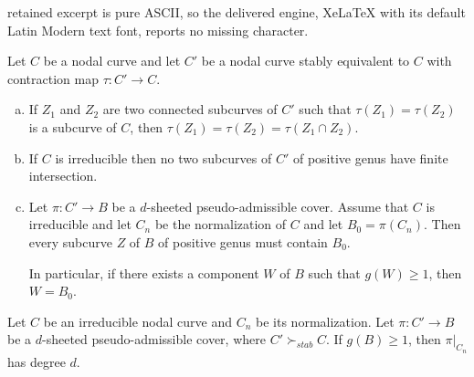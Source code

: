 \documentclass[10pt,a4paper]{amsart}
\newcommand{\steq}{\succ_{stab}}
\begin{document}
retained excerpt is pure ASCII, so the delivered engine, XeLaTeX with its default Latin Modern text font, reports no missing character.
\begin{lemma}\label{lem:3lemas}
Let $C$ be a nodal curve and let ${C}'$ be a nodal curve stably equivalent to $C$ with contraction map $\tau: {C}'\rightarrow C$. 
\begin{enumerate}[(a)]
\item If $Z_1$ and $Z_2$ are two connected subcurves of ${C}'$ such that $\tau(Z_1)= \tau(Z_2)$ is a subcurve of $C$, then $\tau(Z_1)= \tau(Z_2)= \tau(Z_1\cap Z_2)$.
\item If $C$ is irreducible then no two subcurves of ${C}'$ of positive genus have finite intersection.
\item Let $\pi: {C}' \rightarrow B$ be a $d$-sheeted  pseudo-admissible cover.
Assume that $C$ is irreducible and let $C_n$ be the normalization of $C$  and let $B_0 = \pi(C_n)$. Then every subcurve $Z$ of $B$ of positive genus must contain $B_0$.

In particular, if there exists a component $W$ of $B$ such that $g(W)\geq 1$, then $W=B_0$.
\end{enumerate}
\end{lemma}

\begin{proposition} \label{prop:degreeofrestriction}%
Let $C$ be an irreducible nodal curve and $C_n$ be its normalization. 
Let  $\pi:{C}'\rightarrow B$ be a $d$-sheeted pseudo-admissible cover, where ${C}'\steq C$. %
If $g(B)\geq 1$, then $\pi|_{C_n}$ has degree $d$.
\end{proposition}
\end{document}
